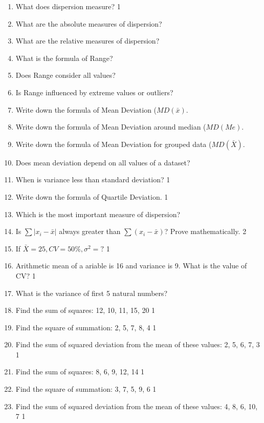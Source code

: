 \documentclass[a4paper,oneside]{book}
\begin{document}
 \begin{enumerate}
 
 \item What does dispersion measure?  \hfill 1
 \item What are the absolute measures of dispersion?
 \item What are the relative measures of dispersion?
 \item What is the formula of Range?
 \item Does Range consider all values?
 \item Is Range influenced by extreme values or outliers?
 \item Write down the formula of Mean Deviation ($MD(\bar x)$.
 \item Write down the formula of Mean Deviation around median ($MD(Me)$.
 \item Write down the formula of Mean Deviation for grouped data ($MD(\bar X)$.
 \item Does mean deviation depend on all values of a dataset?
  \item When is variance less than standard deviation? \hfill 1
  \item Write down the formula of Quartile Deviation. \hfill 1
 \item Which is the most important measure of dispersion?
   \item Is $\sum |x_i-\bar x|$ always greater than $\sum (x_i-\bar x)$? Prove mathematically. \hfill 2
   \item If $\bar X = 25, CV = 50\%, \sigma^2=?$ \hfill 1
   \item Arithmetic mean of a ariable is 16 and variance is 9. What is the value of CV? \hfill 1
   \item What is the variance of first 5 natural numbers?
 
 \item Find the sum of squares: 12, 10, 11, 15, 20 \hfill 1
 \item Find the square of summation: 2, 5, 7, 8, 4 \hfill 1
 \item Find the sum of squared deviation from the mean of these values: 2, 5, 6, 7, 3 \hfill 1
 \item Find the sum of squares: 8, 6, 9, 12, 14 \hfill 1  

\item Find the square of summation: 3, 7, 5, 9, 6 \hfill 1  

\item Find the sum of squared deviation from the mean of these values: 4, 8, 6, 10, 7 \hfill 1  


\end{enumerate}
\end{document}
